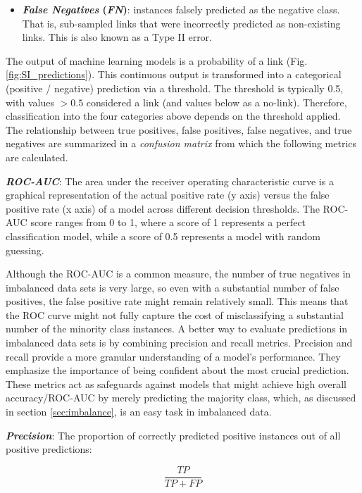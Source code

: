 \documentclass[oneside, a4paper, onecolumn, 11pt]{article}
\begin{document}
\begin{refsection}
\begin{itemize}
    \item \textbf{\textit{False Negatives} (\textit{FN})}: instances falsely predicted as the negative class. That is, sub-sampled links that were incorrectly predicted as non-existing links. This is also known as a Type II error. 
\end{itemize}


The output of machine learning models is a probability of a link (Fig. \ref{fig:SI_predictions}). This continuous output is transformed into a categorical (positive / negative) prediction via a threshold. The threshold is typically 0.5, with values $>0.5$ considered a link (and values below as a no-link). Therefore, classification into the four categories above depends on the threshold applied. The relationship between true positives, false positives, false negatives, and true negatives are summarized in a \textit{confusion matrix} from which the following metrics are calculated.

\textbf{\textit{ROC-AUC}}: The area under the receiver operating characteristic curve is a graphical representation of the actual positive rate (y axis) versus the false positive rate (x axis) of a model across different decision thresholds. The ROC-AUC score ranges from 0 to 1, where a score of 1 represents a perfect classification model, while a score of 0.5 represents a model with random guessing.

Although the ROC-AUC is a common measure, the number of true negatives in imbalanced data sets is very large, so even with a substantial number of false positives, the false positive rate might remain relatively small. This means that the ROC curve might not fully capture the cost of misclassifying a substantial number of the minority class instances. A better way to evaluate predictions in imbalanced data sets is by combining precision and recall metrics. Precision and recall provide a more granular understanding of a model's performance. They emphasize the importance of being confident about the most crucial prediction. These metrics act as safeguards against models that might achieve high overall accuracy/ROC-AUC by merely predicting the majority class, which, as discussed in section \ref{sec:imbalance}, is an easy task in imbalanced data.

\textbf{\textit{Precision}}: The proportion of correctly predicted positive instances out of all positive predictions:

\begin{equation}
    \frac{TP}{TP+FP}
\end{equation}


\end{refsection}
\end{document}
